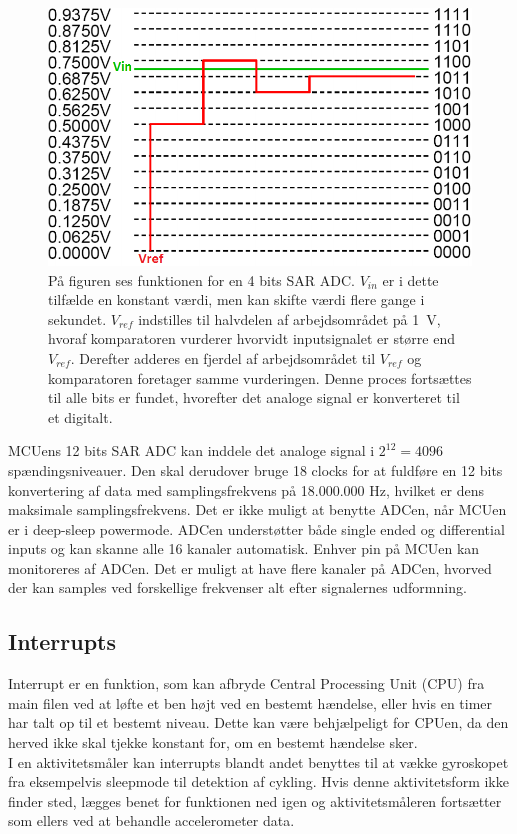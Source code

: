 \begin{figure}[H]
	\centering
	\includegraphics[scale=0.52]{figures/bProblemloesning/SAR_ADC.png}
	\caption{På figuren ses funktionen for en 4 bits SAR ADC. $V_{in}$ er i dette tilfælde en konstant værdi, men kan skifte værdi flere gange i sekundet. $V_{ref}$ indstilles til halvdelen af arbejdsområdet på 1~V, hvoraf komparatoren vurderer hvorvidt inputsignalet er større end $V_{ref}$. Derefter adderes en fjerdel af arbejdsområdet til $V_{ref}$ og komparatoren foretager samme vurderingen. Denne proces fortsættes til alle bits er fundet, hvorefter det analoge signal er konverteret til et digitalt.}
	\label{fig:SAR_ADC}
\end{figure}\vspace{-0.5cm}
MCUens 12 bits SAR ADC kan inddele det analoge signal i $2^{12} = 4096$ spændingsniveauer. Den skal derudover bruge 18 clocks for at fuldføre en 12 bits konvertering af data med samplingsfrekvens på 18.000.000 Hz, hvilket er dens maksimale samplingsfrekvens. Det er ikke muligt at benytte ADCen, når MCUen er i deep-sleep powermode. \newline 
ADCen understøtter både single ended og differential inputs og kan skanne alle 16 kanaler automatisk. Enhver pin på MCUen kan monitoreres af ADCen. Det er muligt at have flere kanaler på ADCen, hvorved der kan samples ved forskellige frekvenser alt efter signalernes udformning. \citep{Semiconductor20164200M}

\subsection{Interrupts}
Interrupt er en funktion, som kan afbryde Central Processing Unit (CPU) fra main filen ved at løfte et ben højt ved en bestemt hændelse, eller hvis en timer har talt op til et bestemt niveau. Dette kan være behjælpeligt for CPUen, da den herved ikke skal tjekke konstant for, om en bestemt hændelse sker. \citep{Badiger2016} \\
I en aktivitetsmåler kan interrupts blandt andet benyttes til at vække gyroskopet fra eksempelvis sleepmode til detektion af cykling. Hvis denne aktivitetsform ikke finder sted, lægges benet for funktionen ned igen og aktivitetsmåleren fortsætter som ellers ved at behandle accelerometer data.

